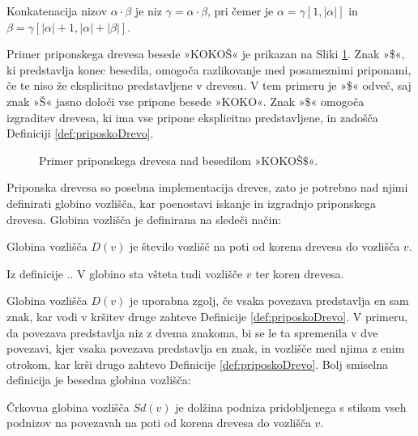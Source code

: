 \begin{defi}
    Konkatenacija nizov $\alpha\cdot\beta$ je niz $\gamma=\alpha\cdot\beta$, pri čemer je $\alpha=\gamma[1,|\alpha|]$ in $\beta=\gamma[|\alpha|+1,|\alpha|+|\beta|]$.
\end{defi}



Primer priponskega drevesa besede »KOKOŠ« je prikazan na Sliki \ref{fig:PriponskoDrevo}. Znak »\$«, ki predstavlja konec besedila, omogoča razlikovanje med posameznimi priponami, če te niso že eksplicitno predstavljene v drevesu. V tem primeru je »\$« odveč, saj znak »Š« jasno določi vse pripone besede »KOKO«. Znak »\$« omogoča izgraditev drevesa, ki ima vse pripone eksplicitno predstavljene, in zadošča Definiciji \ref{def:priposkoDrevo}.

\begin{figure}[htb]
    \begin{center}
        
        \caption{Primer priponskega drevesa nad besedilom »KOKOŠ$\$$«.} 
        \label{fig:PriponskoDrevo}
    \end{center}
\end{figure}


Priponska drevesa so posebna implementacija dreves, zato je potrebno nad njimi definirati globino vozlišča, kar poenostavi iskanje in izgradnjo priponskega drevesa. Globina vozlišča je definirana na sledeči način:

\begin{defi}
   Globina vozlišča $D(v)$ je število vozlišč na poti od korena drevesa do vozlišča $v$. 
\end{defi}

Iz definicije .. V globino sta všteta tudi vozlišče $v$ ter koren drevesa.


Globina vozlišča $D(v)$ je uporabna zgolj, če vsaka povezava predstavlja en sam znak, kar vodi v kršitev druge zahteve Definicije  \ref{def:priposkoDrevo}. V primeru, da povezava predstavlja niz z dvema znakoma, bi se le ta spremenila v dve povezavi, kjer vsaka povezava predstavlja en znak, in vozlišče med njima z enim otrokom, kar krši drugo zahtevo Definicije \ref{def:priposkoDrevo}. Bolj smiselna definicija je besedna globina vozlišča:

\begin{defi}
    Črkovna globina vozlišča $Sd(v)$ je dolžina podniza pridobljenega s stikom vseh podnizov na povezavah na poti od korena drevesa do vozlišča $v$. 
\end{defi}

